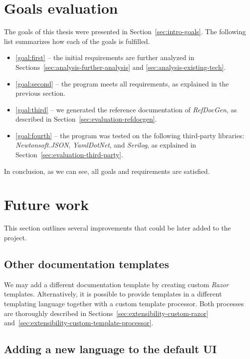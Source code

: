\section*{Goals evaluation}
The goals of this thesis were presented in Section~\ref{sec:intro-goals}.
The following list summarizes how each of the goals is fulfilled.

\begin{itemize}
    \item \ref{goal:first} -- the initial requirements are further analyzed in Sections~\ref{sec:analysis-further-analysis} and \ref{sec:analysis-existing-tech}.
    \item \ref{goal:second} -- the program meets all requirements, as explained in the previous section.
    \item \ref{goal:third} -- we generated the reference documentation of \textit{RefDocGen}, as described in Section~\ref{sec:evaluation-refdocgen}.
    \item \ref{goal:fourth} -- the program was tested on the following third-party libraries: \textit{Newtonsoft.JSON}, \textit{YamlDotNet}, and \textit{Serilog}, as explained in Section~\ref{sec:evaluation-third-party}.
\end{itemize}

In conclusion, as we can see, all goals and requirements are satisfied.

\section*{Future work}

This section outlines several improvements that could be later added to the project.

\subsection*{Other documentation templates}

We may add a different documentation template by creating custom \textit{Razor} templates. 
Alternatively, it is possible to provide templates in a different templating language together with a custom template processor.
Both processes are thoroughly described in Sections~\ref{sec:extensibility-custom-razor} and~\ref{sec:extensibility-custom-template-processor}.

\subsection*{Adding a new language to the default UI}

